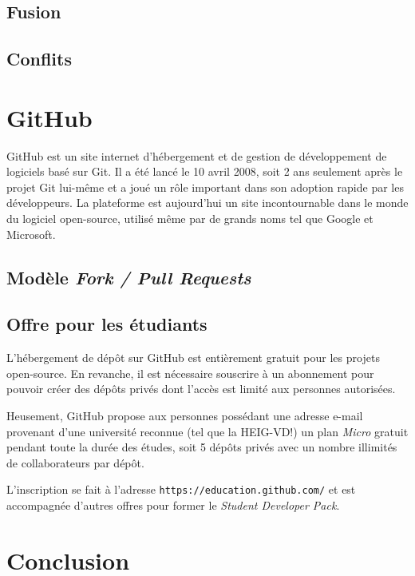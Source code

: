 \documentclass[11pt,a4paper]{article}
\begin{document}
\subsection{Fusion}

\subsection{Conflits}

\pagebreak
\section{GitHub}

GitHub est un site internet d'hébergement et de gestion de développement de logiciels basé sur Git.
Il a été lancé le 10 avril 2008, soit 2 ans seulement après le projet Git lui-même et a joué un rôle important dans son adoption rapide par les développeurs.
La plateforme est aujourd'hui un site incontournable dans le monde du logiciel open-source, utilisé même par de grands noms tel que Google et Microsoft. 

\subsection{Modèle \textit{Fork / Pull Requests}}


\subsection{Offre pour les étudiants}

L'hébergement de dépôt sur GitHub est entièrement gratuit pour les projets open-source.
En revanche, il est nécessaire souscrire à un abonnement pour pouvoir créer des dépôts privés dont l'accès est limité aux personnes autorisées.

Heusement, GitHub propose aux personnes possédant une adresse e-mail provenant d'une université reconnue (tel que la HEIG-VD!) un plan \textit{Micro} gratuit pendant toute la durée des études, soit 5 dépôts privés avec un nombre illimités de collaborateurs par dépôt.

L'inscription se fait à l'adresse {\tt https://education.github.com/} et est accompagnée d'autres offres pour former le {\it Student Developer Pack}.

\section{Conclusion}
\end{document}

